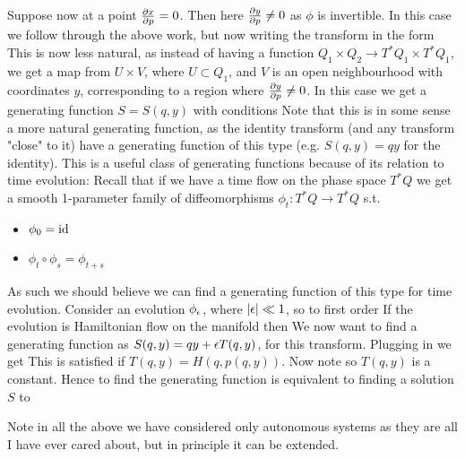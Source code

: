 \documentclass{article}
\begin{document}
Suppose now at a point $\pd[x]{p}=0$. Then here $\pd[y]{p} \neq 0$ as $\phi$ is invertible. In this case we follow through the above work, but now writing the transform in the form 
This is now less natural, as instead of having a function $Q_1 \times Q_2 \to T^\ast Q_1 \times T^\ast Q_1$, we get a map from $U\times V$, where $U \subset Q_1$, and $V$ is an open neighbourhood with coordinates $y$, corresponding to a region where $\pd[y]{p} \neq 0$. In this case we get a generating function $S = S(q,y)$ with conditions 
Note that this is in some sense a more natural generating function, as the identity transform (and any transform "close" to it) have a generating function of this type (e.g. $S(q,y) = qy$ for the identity). This is a useful class of generating functions because of its relation to time evolution:
Recall that if we have a time flow on the phase space $T^\ast Q$ we get a smooth 1-parameter family of diffeomorphisms $\phi_t : T^\ast Q \to T^\ast Q$ s.t. 
\begin{itemize}
    \item $\phi_0 = \id$
    \item $\phi_{t}\circ \phi_s = \phi_{t+s}$
\end{itemize}
As such we should believe we can find a generating function of this type for time evolution. Consider an evolution $\phi_\eps$, where $\abs{\eps} \ll 1$, so to first order 
If the evolution is Hamiltonian flow on the manifold then 
We now want to find a generating function as $S(q,y) = qy + \eps T(q,y)$, for this transform. Plugging in we get 
This is satisfied if $T(q,y)=H(q,p(q,y))$. Now note 
so $T(q,y)$ is a constant. Hence to find the generating function is equivalent to finding a solution $S$ to 
\begin{remark}
Note in all the above we have considered only autonomous systems as they are all I have ever cared about, but in principle it can be extended.
\end{remark}
\end{document}
